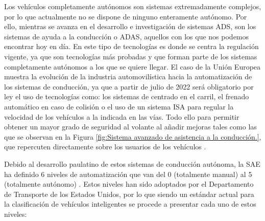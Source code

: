 Los vehículos completamente autónomos son sistemas extremadamente complejos, por lo que actualmente no se dispone de ninguno enteramente autónomo. Por ello, mientras se avanza en el desarrollo e investigación de sistemas \ac{ADS}, son los sistemas de ayuda a la conducción o \ac{ADAS}, aquellos con los que nos podemos encontrar hoy en día. En este tipo de tecnologías es donde se centra la regulación vigente, ya que son tecnologías más probadas y que forman parte de los sistemas completamente autónomos a los que se quiere llegar. El caso de la Unión Europea muestra la evolución de la industria automovilística hacia la automatización de los sistemas de conducción, ya que a partir de julio de 2022 será obligatorio por ley el uso de tecnologías como: los sistemas de centrado en el carril, el frenado automático en caso de colisión o el uso de un sistema \ac{ISA} para regular la velocidad de los vehículos a la indicada en las vías. Todo ello para permitir obtener un mayor grado de seguridad al volante al añadir mejoras tales como las que se observan en la Figura \ref{fig:Sistema avanzado de asistencia a la conducción.}, que repercuten directamente sobre los usuarios de los vehículos \cite{adas_spain, adas_eu}.

Debido al desarrollo paulatino de estos sistemas de conducción autónoma, la \ac{SAE} ha definido 6 niveles de automatización que van del 0 (totalmente manual) al 5 (totalmente autónomo) \cite{autonomy_levels}. Estos niveles han sido adoptados por el Departamento de Transporte de los Estados Unidos, por lo que siendo un estándar actual para la clasificación de vehículos inteligentes se procede a presentar cada uno de estos niveles:

